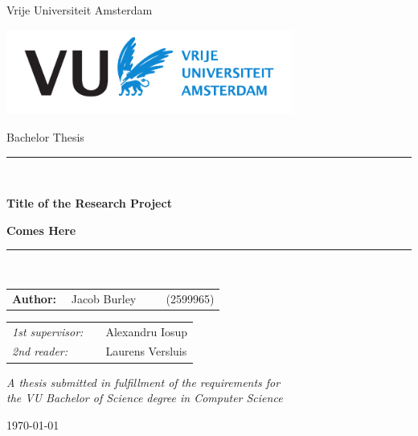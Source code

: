 \documentclass[11pt]{article}
\begin{document}
\thispagestyle{empty}

\begin{center}

Vrije Universiteit Amsterdam

\vspace{1mm}

\includegraphics[height=28mm]{vu-griffioen-white.pdf}

\vspace{1.5cm}

{\Large Bachelor Thesis}

\vspace*{1.5cm}

\rule{.9\linewidth}{.6pt}\\[0.4cm]
{\huge \bfseries Title of the Research Project\par}
{\huge \bfseries Comes Here\par}\vspace{0.4cm}
\rule{.9\linewidth}{.6pt}\\[1.5cm]

\vspace*{2mm}

{\Large
\begin{tabular}{l}
{\bf Author:} ~~Jacob Burley ~~~~ (2599965)
\end{tabular}
}

\vspace*{1.5cm}

\begin{tabular}{ll}
{\it 1st supervisor:}   & ~~Alexandru Iosup \\
{\it 2nd reader:}       & ~~Laurens Versluis
\end{tabular}

\vspace*{2cm}

\textit{A thesis submitted in fulfillment of the requirements for\\ the VU Bachelor of Science degree in Computer Science}

\vspace*{1cm}

\today\\[4cm] %

\end{center}
\end{document}
